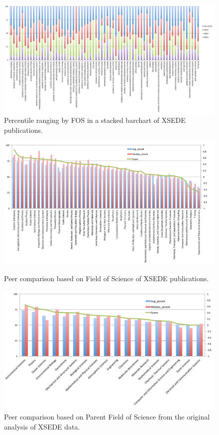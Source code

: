 \documentclass{sig-alternate}
\begin{document}
\begin{figure}[htb!] 
  \centering 
    \includegraphics[width=1.0\textwidth]{images-new/xsede-journal-stacked.pdf} 
  \caption{Percentile ranging by FOS in a stacked barchart of XSEDE publications.}\label{F:xsede-stacked} 
\end{figure}

\bigskip

\begin{figure}[htb!] 
  \centering 
    \includegraphics[width=.9\textwidth]{images-new/a.pdf} 
  \caption{Peer comparison based on Field of Science of XSEDE publications.}\label{F:xsede-fos-a} 


  \centering 
    \includegraphics[width=.9\textwidth]{images-new/b.pdf} 
  \caption{Peer comparison based on Parent Field of Science from the original analysis of XSEDE data.}\label{F:xsede-stacked-b} 


\end{figure} 
\end{document}
